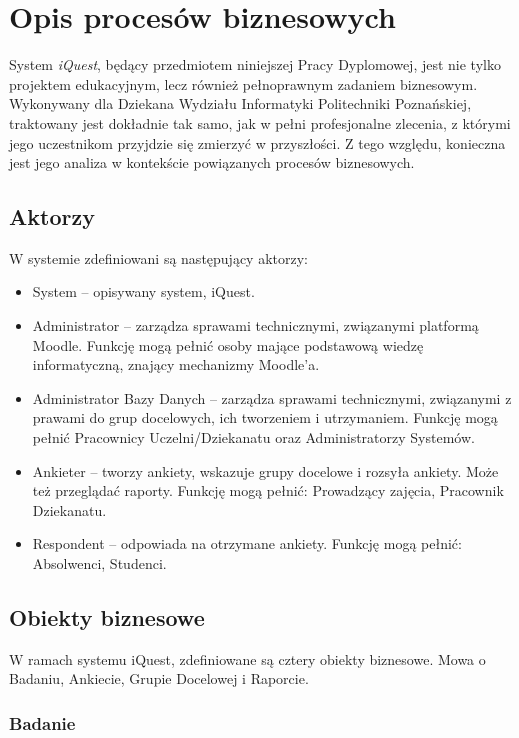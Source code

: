 \chapter{Opis procesów biznesowych}
\label{Chapter2}

System \textit{iQuest}, będący przedmiotem niniejszej Pracy Dyplomowej, jest nie tylko projektem edukacyjnym, lecz również pełnoprawnym zadaniem biznesowym. Wykonywany dla Dziekana Wydziału Informatyki Politechniki Poznańskiej, traktowany jest dokładnie tak samo, jak w pełni profesjonalne zlecenia, z którymi jego uczestnikom przyjdzie się zmierzyć w przyszłości. Z tego względu, konieczna jest jego analiza w kontekście powiązanych procesów biznesowych.

\section{Aktorzy}
\label{Chapter21}

W systemie zdefiniowani są następujący aktorzy:
\begin{itemize}
\item System -- opisywany system, iQuest.
\item Administrator -- zarządza sprawami technicznymi, związanymi platformą Moodle. Funkcję mogą pełnić osoby mające podstawową wiedzę informatyczną, znający mechanizmy Moodle'a.
\item Administrator Bazy Danych -- zarządza sprawami technicznymi, związanymi z prawami do grup docelowych, ich tworzeniem i utrzymaniem. Funkcję mogą pełnić Pracownicy Uczelni\slash Dziekanatu oraz Administratorzy Systemów.
\item Ankieter -- tworzy ankiety, wskazuje grupy docelowe i rozsyła ankiety. Może też przeglądać raporty. Funkcję mogą pełnić: Prowadzący zajęcia, Pracownik Dziekanatu.
\item Respondent -- odpowiada na otrzymane ankiety. Funkcję mogą pełnić: Absolwenci, Studenci.
\end{itemize}

\section{Obiekty biznesowe}
\label{Chapter22}

W ramach systemu iQuest, zdefiniowane są cztery obiekty biznesowe. Mowa o Badaniu, Ankiecie, Grupie Docelowej i Raporcie.

\subsection{Badanie}
\label{Chapter221}

